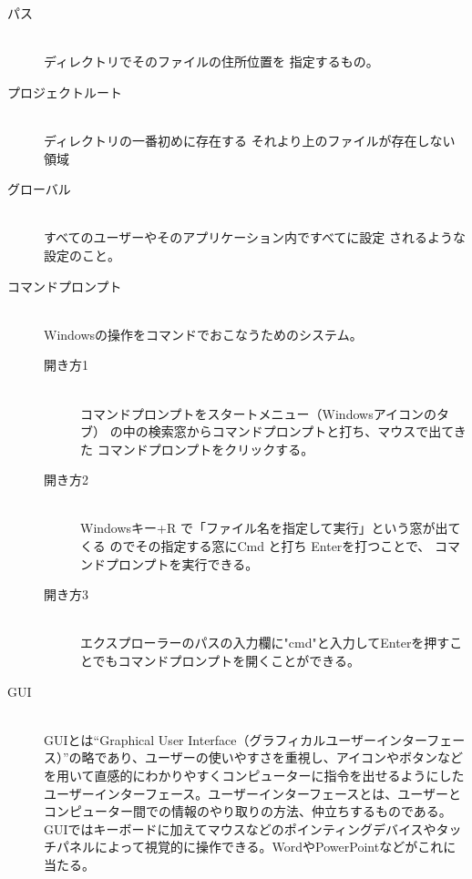 \documentclass[titlepage]{ltjsarticle}
\begin{document}
\begin{description}
  \item [パス] ~\\
    ディレクトリでそのファイルの住所位置を
    指定するもの。
  \item [プロジェクトルート] ~\\
    ディレクトリの一番初めに存在する
    それより上のファイルが存在しない領域
  \item [グローバル] ~\\
    すべてのユーザーやそのアプリケーション内ですべてに設定
    されるような設定のこと。
  \item [コマンドプロンプト] ~\\
    Windowsの操作をコマンドでおこなうためのシステム。
    \begin{description}
      \item[開き方1] ~\\
      コマンドプロンプトをスタートメニュー（Windowsアイコンのタブ）
      の中の検索窓からコマンドプロンプトと打ち、マウスで出てきた
      コマンドプロンプトをクリックする。
      \item[開き方2] ~\\
      Windowsキー+R で「ファイル名を指定して実行」という窓が出てくる
      のでその指定する窓にCmd と打ち Enterを打つことで、
      コマンドプロンプトを実行できる。
      \item[開き方3]~\\
      エクスプローラーのパスの入力欄に"cmd"と入力してEnterを押すことでもコマンドプロンプトを開くことができる。 \end{description}
    \item[GUI]~\\
      GUIとは``Graphical User Interface（グラフィカルユーザーインターフェース）''の略であり、ユーザーの使いやすさを重視し、アイコンやボタンなどを用いて直感的にわかりやすくコンピューターに指令を出せるようにしたユーザーインターフェース。ユーザーインターフェースとは、ユーザーとコンピューター間での情報のやり取りの方法、仲立ちするものである。GUIではキーボードに加えてマウスなどのポインティングデバイスやタッチパネルによって視覚的に操作できる。WordやPowerPointなどがこれに当たる。

\end{description}
\end{document}
